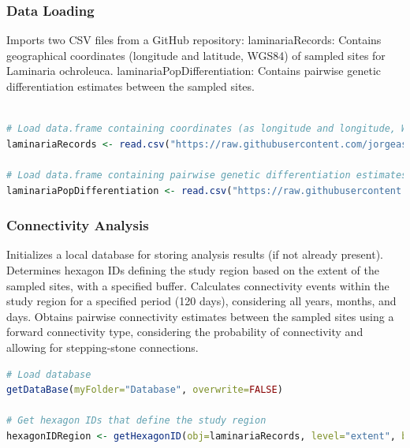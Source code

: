 \documentclass[
]{article}
\begin{document}
\subsubsection{Data Loading}\label{data-loading}

Imports two CSV files from a GitHub repository: laminariaRecords:
Contains geographical coordinates (longitude and latitude, WGS84) of
sampled sites for Laminaria ochroleuca. laminariaPopDifferentiation:
Contains pairwise genetic differentiation estimates between the sampled
sites.

\begin{lstlisting}[language=R]

# Load data.frame containing coordinates (as longitude and longitude, WGS84) of sites sampled for the marine species Laminaria ochroleuca.
laminariaRecords <- read.csv("https://raw.githubusercontent.com/jorgeassis/coastalNet/main/vignettes/data/Laminaria-ochroleuca-Coords.csv", sep=";", header = TRUE)

# Load data.frame containing pairwise genetic differentiation estimates between coordinate sites
laminariaPopDifferentiation <- read.csv("https://raw.githubusercontent.com/jorgeassis/coastalNet/main/vignettes/data/Laminaria-ochroleuca-JostD.csv", sep=";", header = FALSE)
\end{lstlisting}

\subsubsection{Connectivity Analysis}\label{connectivity-analysis}

Initializes a local database for storing analysis results (if not
already present). Determines hexagon IDs defining the study region based
on the extent of the sampled sites, with a specified buffer. Calculates
connectivity events within the study region for a specified period (120
days), considering all years, months, and days. Obtains pairwise
connectivity estimates between the sampled sites using a forward
connectivity type, considering the probability of connectivity and
allowing for stepping-stone connections.

\begin{lstlisting}[language=R]
# Load database
getDataBase(myFolder="Database", overwrite=FALSE)

# Get hexagon IDs that define the study region
hexagonIDRegion <- getHexagonID(obj=laminariaRecords, level="extent", buffer=5, print=TRUE)
\end{lstlisting}
\end{document}
